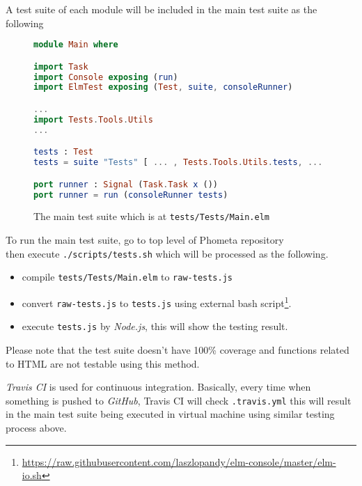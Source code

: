\documentclass[master.tex]{subfiles}
\begin{document}
A test suite of each module will be included in the main test suite as the
following

\begin{figure}[H]
\begin{framed}
\begin{lstlisting}[language=elm]
module Main where

import Task
import Console exposing (run)
import ElmTest exposing (Test, suite, consoleRunner)

...
import Tests.Tools.Utils
...

tests : Test
tests = suite "Tests" [ ... , Tests.Tools.Utils.tests, ... ]

port runner : Signal (Task.Task x ())
port runner = run (consoleRunner tests)
\end{lstlisting}
\end{framed}
\caption{The main test suite which is at \texttt{tests/Tests/Main.elm}}
\label{fig:implementation-test-main}
\end{figure}

To run the main test suite, go to top level of Phometa repository\\ then execute
\texttt{./scripts/tests.sh} which will be processed as the following.
\begin{itemize}
\item compile \texttt{tests/Tests/Main.elm} to \texttt{raw-tests.js}
\item convert \texttt{raw-tests.js} to \texttt{tests.js} using external bash
  script\footnote{\url{https://raw.githubusercontent.com/laszlopandy/elm-console/master/elm-io.sh}}.
\item execute \texttt{tests.js} by \emph{Node.js}, this will show the testing result.
\end{itemize}

Please note that the test suite doesn't have 100\% coverage and functions
related to HTML are not testable using this method.

\emph{Travis CI} is used for continuous integration. Basically, every time when
something is pushed to \emph{GitHub}, Travis CI will check \texttt{.travis.yml}
this will result in the main test suite being executed in virtual machine using
similar testing process above.
\end{document}
